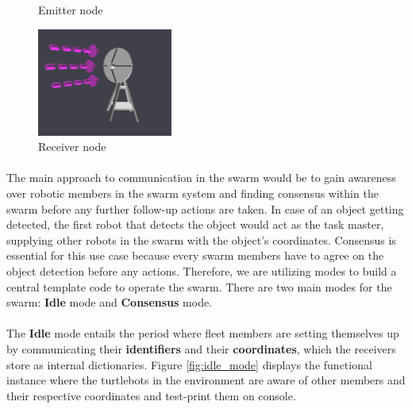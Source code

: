 \begin{figure}[!htb]
        \caption{Emitter node}\label{fig:Emitter}
    \endminipage\hfill
        \includegraphics[width=\linewidth]{progress_report_1/assets/images/communication/devices/receiver.png}
        \caption{Receiver node}\label{fig:Receiver}
    \endminipage
\end{figure}

\paragraph*{}
The main approach to communication in the swarm would be to gain awareness over robotic members in the swarm system and finding consensus within the swarm before any further follow-up actions are taken. In case of an object getting detected, the first robot that detects the object would act as the task master, supplying other robots in the swarm with the object's coordinates. Consensus is essential for this use case because every swarm members have to agree on the object detection before any actions. Therefore, we are utilizing modes to build a central template code to operate the swarm. There are two main modes for the swarm: \textbf{Idle} mode and \textbf{Consensus} mode.

\paragraph*{}
The \textbf{Idle} mode entails the period where fleet members are setting themselves up by communicating their \textbf{identifiers} and their \textbf{coordinates}, which the receivers store as internal dictionaries. Figure \ref{fig:idle_mode} displays the functional instance where the turtlebots in the environment are aware of other members and their respective coordinates and test-print them on console.

